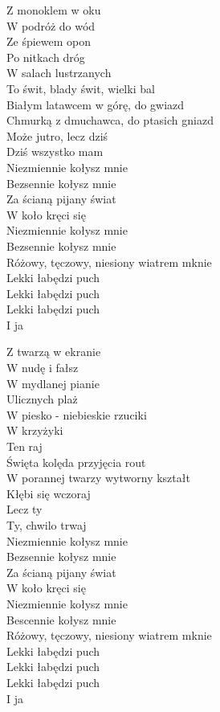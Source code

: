 
\begin{text}
    Z monoklem w oku\\
    W podróż do wód\\
    Ze śpiewem opon\\
    Po nitkach dróg\\
    W salach lustrzanych\\
    To świt, blady świt, wielki bal\\
    Białym latawcem w górę, do gwiazd\\
    Chmurką z dmuchawca, do ptasich gniazd\\
    Może jutro, lecz dziś\\
    Dziś wszystko mam\\
    Niezmiennie kołysz mnie\\
    Bezsennie kołysz mnie\\
    Za ścianą pijany świat\\
    W koło kręci się\\
    Niezmiennie kołysz mnie\\
    Bezsennie kołysz mnie\\
    Różowy, tęczowy, niesiony wiatrem mknie\\
    Lekki łabędzi puch\\
    Lekki łabędzi puch\\
    Lekki łabędzi puch\\
    I ja

    Z twarzą w ekranie\\
    W nudę i fałsz\\
    W mydlanej pianie\\
    Ulicznych plaż\\
    W piesko - niebieskie rzuciki\\
    W krzyżyki\\
    Ten raj\\
    Święta kolęda przyjęcia rout\\
    W porannej twarzy wytworny kształt\\
    Kłębi się wczoraj\\
    Lecz ty\\
    Ty, chwilo trwaj\\
    Niezmiennie kołysz mnie\\
    Bezsennie kołysz mnie\\
    Za ścianą pijany świat\\
    W koło kręci się\\
    Niezmiennie kołysz mnie\\
    Bescennie kołysz mnie\\
    Różowy, tęczowy, niesiony wiatrem mknie\\
    Lekki łabędzi puch\\
    Lekki łabędzi puch\\
    Lekki łabędzi puch\\
    I ja
\end{text}
\begin{chord}

\end{chord}